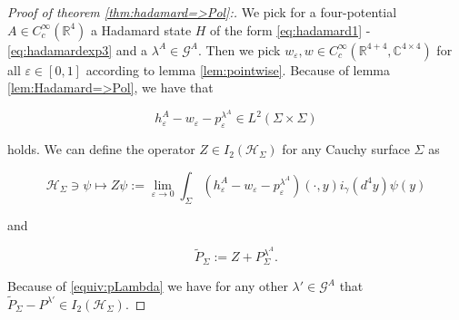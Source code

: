 \documentclass[b5paper,draft,openbib,12pt]{memoir}
\begin{document}
\begin{proof}[Proof of theorem \ref{thm:hadamard=>Pol}:]
We pick for a four-potential \(A\in C_c^\infty(\mathbb{R}^4)\) a Hadamard state \(H\) of the form \eqref{eq:hadamard1} -\eqref{eq:hadamardexp3} 
and a \(\lambda^A\in\mathcal{G}^A\). Then we pick 
\(w_\varepsilon,w \in C_c^\infty(\mathbb{R}^{4+4},\mathbb{C}^{4\times 4})\) for all \(\varepsilon\in [0,1]\) according to lemma \ref{lem:pointwise}.
Because of lemma \ref{lem:Hadamard=>Pol}, we have that

\begin{equation}
h_\varepsilon^A-w_\varepsilon-p^{\lambda^A}_\varepsilon \in L^2(\Sigma\times\Sigma)
\end{equation}

holds. We can define the operator \(Z \in I_2(\mathcal{H}_\Sigma)\) for any Cauchy surface \(\Sigma\) as

\begin{equation}
\mathcal{H}_\Sigma\ni \psi\mapsto Z \psi := \lim_{\varepsilon \rightarrow 0} 
\int_{\Sigma} (h_\varepsilon^A-w_\varepsilon-p^{\lambda^A}_\varepsilon)(\cdot,y) i_\gamma(d^4y) \psi(y) 
\end{equation}

and

\begin{equation}
\tilde{P}_\Sigma:=Z + P^{\lambda^A}_\Sigma.
\end{equation}

Because of \eqref{equiv:pLambda} we have for any other \(\lambda' \in\mathcal{G}^A\) that \(\tilde{P}_\Sigma-P^{\lambda'}\in I_2(\mathcal{H}_\Sigma)\).


\end{proof}
\end{document}
